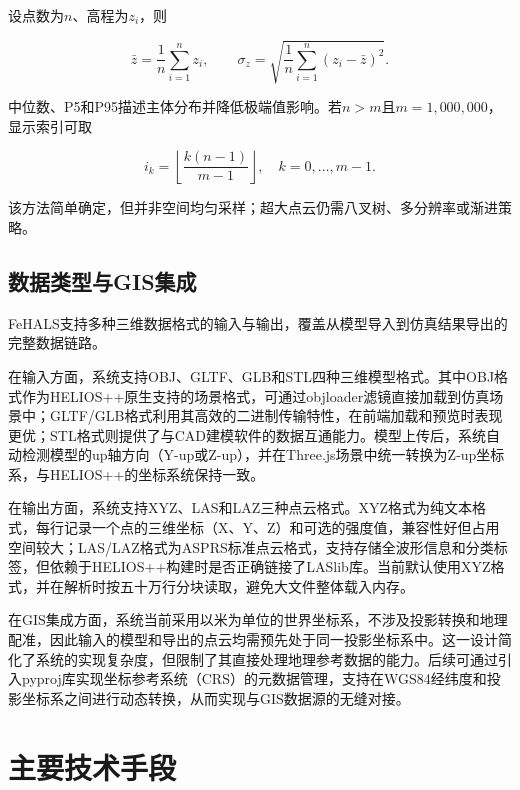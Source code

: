 \documentclass[a4paper,fleqn]{cas-sc}
\begin{document}
设点数为$n$、高程为$z_i$，则

\begin{equation}
    \bar{z} = \frac{1}{n}\sum_{i=1}^{n} z_i, \qquad
    \sigma_z = \sqrt{\frac{1}{n}\sum_{i=1}^{n} (z_i - \bar{z})^2}.
\end{equation}

中位数、P5和P95描述主体分布并降低极端值影响。若$n > m$且$m = 1,000,000$，显示索引可取

\begin{equation}
    i_k = \left\lfloor \frac{k(n-1)}{m-1} \right\rfloor, \quad k = 0, \dots, m-1.
\end{equation}

该方法简单确定，但并非空间均匀采样；超大点云仍需八叉树、多分辨率或渐进策略\citep{pointCloudRendering,pointCloudTerrain}。

\subsection{数据类型与GIS集成}

FeHALS支持多种三维数据格式的输入与输出，覆盖从模型导入到仿真结果导出的完整数据链路。

在输入方面，系统支持OBJ、GLTF、GLB和STL四种三维模型格式。其中OBJ格式作为HELIOS++原生支持的场景格式，可通过objloader滤镜直接加载到仿真场景中；GLTF/GLB格式利用其高效的二进制传输特性，在前端加载和预览时表现更优；STL格式则提供了与CAD建模软件的数据互通能力。模型上传后，系统自动检测模型的up轴方向（Y-up或Z-up），并在Three.js场景中统一转换为Z-up坐标系，与HELIOS++的坐标系统保持一致。

在输出方面，系统支持XYZ、LAS和LAZ三种点云格式。XYZ格式为纯文本格式，每行记录一个点的三维坐标（X、Y、Z）和可选的强度值，兼容性好但占用空间较大；LAS/LAZ格式为ASPRS标准点云格式，支持存储全波形信息和分类标签，但依赖于HELIOS++构建时是否正确链接了LASlib库。当前默认使用XYZ格式，并在解析时按五十万行分块读取，避免大文件整体载入内存。

在GIS集成方面，系统当前采用以米为单位的世界坐标系，不涉及投影转换和地理配准，因此输入的模型和导出的点云均需预先处于同一投影坐标系中。这一设计简化了系统的实现复杂度，但限制了其直接处理地理参考数据的能力。后续可通过引入pyproj库实现坐标参考系统（CRS）的元数据管理，支持在WGS84经纬度和投影坐标系之间进行动态转换，从而实现与GIS数据源的无缝对接。

\section{主要技术手段}
\end{document}
